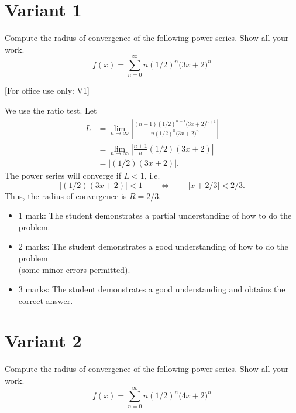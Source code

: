 \documentclass{article}
\begin{document}
        \newpage
        \section{Variant 1}
        \label{v1}


Compute the radius of convergence of the following power series. Show all your work.
    \[
    f(x) = \sum_{n=0}^\infty n\left(1/2\right)^n \big(3x + 2\big)^n
    \]


[For office use only: V1]
        \medskip



    We use the ratio test. Let
      \begin{align*}
        L &= \lim_{n\to\infty} \left| 
        \frac{(n+1)\left(1/2\right)^{n+1}\big(3x + 2\big)^{n+1}}
        {n\left(1/2\right)^n \big(3x + 2\big)^n}
        \right|\\
        &= \lim_{n\to\infty} \left| \frac{n+1}{n}(1/2)(3x+2)\right| \\
        &= \left| (1/2)(3x+2)\right|.
       \end{align*}
       The power series will converge if $L < 1$, i.e.
       \[
        \left| (1/2)(3x+2)\right| < 1 \qquad\Longleftrightarrow \qquad
        \left|x + 2/3\right| < 2/3.
       \]
       Thus, the radius of convergence is $R = 2/3$.
        \medskip

            \begin{small}
            \begin{itemize}
            \item 1 mark: The student demonstrates a partial understanding of how to do the problem.
            \item 2 marks: The student demonstrates a good understanding of how to do the problem \\ (some minor errors permitted).
            \item 3 marks: The student demonstrates a good understanding and obtains the correct answer.
            \end{itemize}
            \end{small}


        \newpage
        \section{Variant 2}
        \label{v2}


Compute the radius of convergence of the following power series. Show all your work.
    \[
    f(x) = \sum_{n=0}^\infty n\left(1/2\right)^n \big(4x + 2\big)^n
    \]
\end{document}

